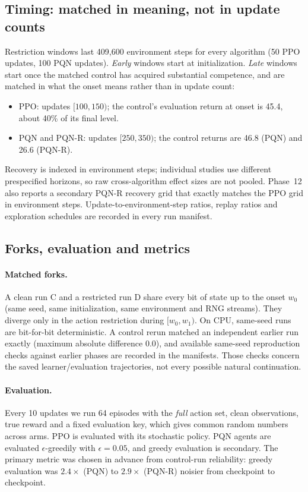 \documentclass[10pt]{article} %
\begin{document}
\subsection{Timing: matched in meaning, not in update counts}
Restriction windows last 409{,}600 environment steps for every algorithm (50 PPO updates, 100 PQN updates). \emph{Early} windows start at initialization. \emph{Late} windows start once the matched control has acquired substantial competence, and are matched in what the onset means rather than in update count:
\begin{itemize}
\item PPO: updates $[100,150)$; the control's evaluation return at onset is 45.4, about 40\% of its final level.
\item PQN and PQN-R: updates $[250,350)$; the control returns are 46.8 (PQN) and 26.6 (PQN-R).
\end{itemize}
Recovery is indexed in environment steps; individual studies use different prespecified horizons, so raw cross-algorithm effect sizes are not pooled. Phase~12 also reports a secondary PQN-R recovery grid that exactly matches the PPO grid in environment steps. Update-to-environment-step ratios, replay ratios and exploration schedules are recorded in every run manifest.

\subsection{Forks, evaluation and metrics}

\paragraph{Matched forks.}
A clean run C and a restricted run D share every bit of state up to the onset $w_0$ (same seed, same initialization, same environment and RNG streams). They diverge only in the action restriction during $[w_0,w_1)$. On CPU, same-seed runs are bit-for-bit deterministic. A control rerun matched an independent earlier run exactly (maximum absolute difference 0.0), and available same-seed reproduction checks against earlier phases are recorded in the manifests. Those checks concern the saved learner/evaluation trajectories, not every possible natural continuation.

\paragraph{Evaluation.}
Every 10 updates we run 64 episodes with the \emph{full} action set, clean observations, true reward and a fixed evaluation key, which gives common random numbers across arms. PPO is evaluated with its stochastic policy. PQN agents are evaluated $\epsilon$-greedily with $\epsilon=0.05$, and greedy evaluation is secondary. The primary metric was chosen in advance from control-run reliability: greedy evaluation was $2.4\times$ (PQN) to $2.9\times$ (PQN-R) noisier from checkpoint to checkpoint.
\end{document}
